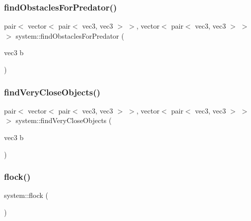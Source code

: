 \mbox{\label{classsystem_aecaeaf720a0f4f7fc1a484359f0095c9}} 
\subsubsection{\texorpdfstring{find\+Obstacles\+For\+Predator()}{findObstaclesForPredator()}}
{\footnotesize\ttfamily pair$<$ vector$<$ pair$<$ vec3, vec3 $>$ $>$, vector$<$ pair$<$ vec3, vec3 $>$ $>$ $>$ system\+::find\+Obstacles\+For\+Predator (\begin{DoxyParamCaption}\item[{vec3}]{b }\end{DoxyParamCaption})}

\mbox{\label{classsystem_a213116ee6222958bd53c16dad4b49756}} 
\subsubsection{\texorpdfstring{find\+Very\+Close\+Objects()}{findVeryCloseObjects()}}
{\footnotesize\ttfamily pair$<$ vector$<$ pair$<$ vec3, vec3 $>$ $>$, vector$<$ pair$<$ vec3, vec3 $>$ $>$ $>$ system\+::find\+Very\+Close\+Objects (\begin{DoxyParamCaption}\item[{vec3}]{b }\end{DoxyParamCaption})}

\mbox{\label{classsystem_a6111884d57e02489e3d2384a082d3965}} 
\subsubsection{\texorpdfstring{flock()}{flock()}}
{\footnotesize\ttfamily system\+::flock (\begin{DoxyParamCaption}{ }\end{DoxyParamCaption})}

\mbox{\label{classsystem_afde340a58ca93892b9ded76a7763b2f8}} 
